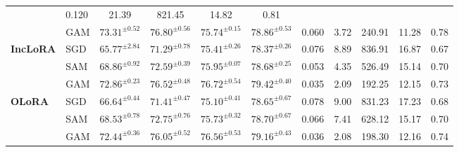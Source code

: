 \documentclass{article}
\theoremstyle{plain}
\theoremstyle{definition}
\theoremstyle{remark}
\begin{document}
\begin{table}[t]
{\begin{tabular}{l l cccc ccc cc}
& 0.120 & 21.39                & 821.45
& 14.82 & 0.81 \\
& GAM
& $\mathbf{73.31}^{\pm 0.52}$ & \textbf{$\mathbf{76.80}^{\pm 0.56}$}
& $\mathbf{75.74}^{\pm 0.15}$ & \textbf{$\mathbf{78.86}^{\pm 0.53}$}
& 0.060 & 3.72                 & 240.91 
& 11.28 & 0.78 \\
\midrule
\multirow{3}{*}{\textbf{IncLoRA}}
& SGD
& $65.77^{\pm 2.84}$ & $71.29^{\pm 0.78}$
& $75.41^{\pm 0.26}$ & $78.37^{\pm 0.26}$
& 0.076 & 8.89                 & 836.91    
& 16.87 & 0.67 \\
& SAM
& $68.86^{\pm 0.92}$ & $72.59^{\pm 0.39}$
& $75.95^{\pm 0.07}$ & $78.68^{\pm 0.25}$
& 0.053 & 4.35                 & 526.49     
& 15.14 & 0.70 \\
& GAM
& $\mathbf{72.86}^{\pm 0.23}$ & $\mathbf{76.52}^{\pm 0.48}$
& $\mathbf{76.72}^{\pm 0.54}$ & $\mathbf{79.42}^{\pm 0.40}$ 
& 0.035 & 2.09                 & 192.25 
& 12.15 & 0.73 \\
\midrule
\multirow{3}{*}{\textbf{OLoRA}}
& SGD
& $66.64^{\pm 0.44}$ & $71.41^{\pm 0.47}$
& $75.10^{\pm 0.41}$ & $78.65^{\pm 0.67}$
& 0.078 & 9.00                 & 831.23
& 17.23 & 0.68 \\
& SAM
& $68.53^{\pm 0.78}$ & $72.75^{\pm 0.76}$
& $75.73^{\pm 0.32}$ & $78.70^{\pm 0.67}$
& 0.066 & 7.41                 & 628.12   
& 15.17 & 0.70 \\
& GAM
& $\mathbf{72.44}^{\pm 0.36}$ & $\mathbf{76.05}^{\pm 0.52}$
& $\mathbf{76.56}^{\pm 0.53}$ & $\mathbf{79.16}^{\pm 0.43}$
& 0.036& 2.08                 & 198.30  
& 12.16 & 0.74 \\
\bottomrule
\end{tabular}
}
\end{table}
\end{document}
